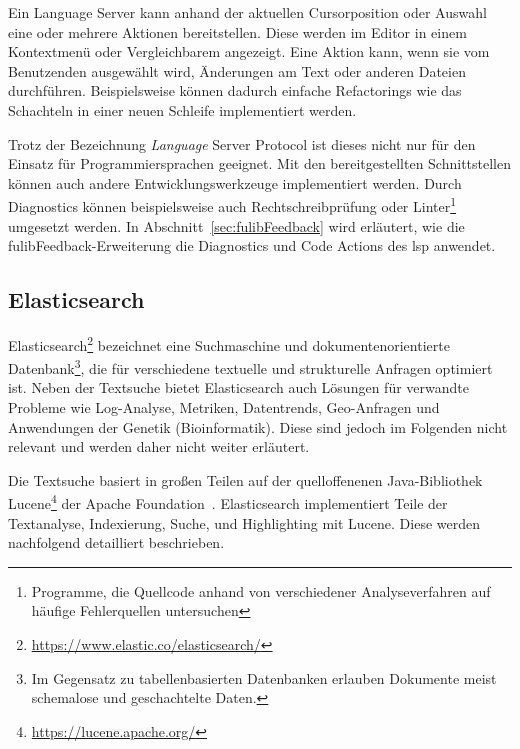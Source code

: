\begin{description}
    Ein Language Server kann anhand der aktuellen Cursorposition oder Auswahl eine oder mehrere Aktionen bereitstellen.
    Diese werden im Editor in einem Kontextmenü oder Vergleichbarem angezeigt.
    Eine Aktion kann, wenn sie vom Benutzenden ausgewählt wird, Änderungen am Text oder anderen Dateien durchführen.
    Beispielsweise können dadurch einfache Refactorings wie das Schachteln in einer neuen Schleife implementiert werden.
\end{description}

Trotz der Bezeichnung \emph{Language} Server Protocol ist dieses nicht nur für den Einsatz für Programmiersprachen geeignet.
Mit den bereitgestellten Schnittstellen können auch andere Entwicklungswerkzeuge implementiert werden.
Durch Diagnostics können beispielsweise auch Rechtschreibprüfung oder Linter\footnote{Programme, die Quellcode anhand von verschiedener Analyseverfahren auf häufige Fehlerquellen untersuchen} umgesetzt werden.
In Abschnitt~\ref{sec:fulibFeedback} wird erläutert, wie die fulibFeedback-Erweiterung die Diagnostics und Code Actions des \ac{lsp} anwendet.

\subsection{Elasticsearch}\label{subsec:elasticsearch}

Elasticsearch\footnote{\url{https://www.elastic.co/elasticsearch/}} bezeichnet eine Suchmaschine und dokumentenorientierte Datenbank\footnote{Im Gegensatz zu tabellenbasierten Datenbanken erlauben Dokumente meist schemalose und geschachtelte Daten.}, die für verschiedene textuelle und strukturelle Anfragen optimiert ist.
Neben der Textsuche bietet Elasticsearch auch Lösungen für verwandte Probleme wie Log-Analyse, Metriken, Datentrends, Geo-Anfragen und Anwendungen der Genetik (Bioinformatik).
Diese sind jedoch im Folgenden nicht relevant und werden daher nicht weiter erläutert.

Die Textsuche basiert in großen Teilen auf der quelloffenenen Java-Bibliothek Lucene\footnote{\url{https://lucene.apache.org/}} der Apache Foundation~\cite{elastic-and-lucene}.
Elasticsearch implementiert Teile der Textanalyse, Indexierung, Suche, und Highlighting mit Lucene.
Diese werden nachfolgend detailliert beschrieben.

